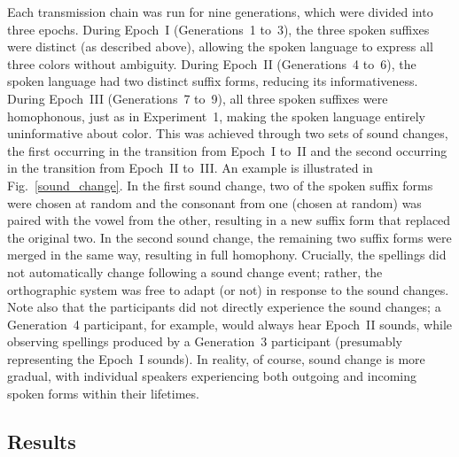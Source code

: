 \documentclass[doc,biblatex]{apa7}
\begin{document}
Each transmission chain was run for nine generations, which were divided into three epochs. During Epoch~I (Generations~1 to~3), the three spoken suffixes were distinct (as described above), allowing the spoken language to express all three colors without ambiguity. During Epoch~II (Generations~4 to~6), the spoken language had two distinct suffix forms, reducing its informativeness. During Epoch~III (Generations~7 to~9), all three spoken suffixes were homophonous, just as in Experiment~1, making the spoken language entirely uninformative about color. This was achieved through two sets of sound changes, the first occurring in the transition from Epoch~I to~II and the second occurring in the transition from Epoch~II to~III. An example is illustrated in Fig.~\ref{sound_change}. In the first sound change, two of the spoken suffix forms were chosen at random and the consonant from one (chosen at random) was paired with the vowel from the other, resulting in a new suffix form that replaced the original two. In the second sound change, the remaining two suffix forms were merged in the same way, resulting in full homophony. Crucially, the spellings did not automatically change following a sound change event; rather, the orthographic system was free to adapt (or not) in response to the sound changes. Note also that the participants did not directly experience the sound changes; a Generation~4 participant, for example, would always hear Epoch~II sounds, while observing spellings produced by a Generation~3 participant (presumably representing the Epoch~I sounds). In reality, of course, sound change is more gradual, with individual speakers experiencing both outgoing and incoming spoken forms within their lifetimes.

\subsection{Results}
\end{document}
